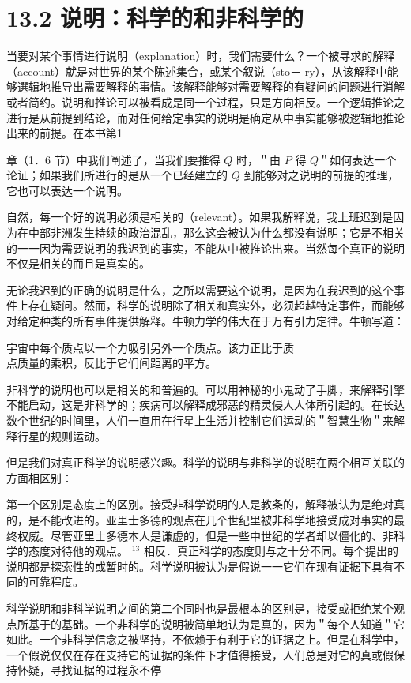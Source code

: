 \section*{13.2 说明：科学的和非科学的}
当要对某个事情进行说明（explanation）时，我们需要什么？一个被寻求的解释（account）就是对世界的某个陈述集合，或某个叙说（sto－ ry），从该解释中能够選辑地推导出需要解释的事情。该解释能够对需要解释的有疑问的问题进行消解或者简约。说明和推论可以被看成是同一个过程，只是方向相反。一个逻辑推论之进行是从前提到结论，而对任何给定事实的说明是确定从中事实能够被逻辑地推论出来的前提。在本书第1

章（1．6 节）中我们阐述了，当我们要推得 $Q$ 时，＂由 $P$ 得 $Q$＂如何表达一个论证；如果我们所进行的是从一个已经建立的 $Q$ 到能够对之说明的前提的推理，它也可以表达一个说明。

自然，每一个好的说明必须是相关的（relevant）。如果我解释说，我上班迟到是因为在中部非洲发生持续的政治混乱，那么这会被认为什么都没有说明；它是不相关的一一因为需要说明的我迟到的事实，不能从中被推论出来。当然每个真正的说明不仅是相关的而且是真实的。

无论我迟到的正确的说明是什么，之所以需要这个说明，是因为在我迟到的这个事件上存在疑问。然而，科学的说明除了相关和真实外，必须超越特定事件，而能够对给定种类的所有事件提供解释。牛顿力学的伟大在于万有引力定律。牛顿写道：

\begin{displayquote}
宇宙中每个质点以一个力吸引另外一个质点。该力正比于质\\
点质量的乘积，反比于它们间距离的平方。
\end{displayquote}

非科学的说明也可以是相关的和普遍的。可以用神秘的小鬼动了手脚，来解释引擎不能启动，这是非科学的；疾病可以解释成邪恶的精灵侵人人体所引起的。在长达数个世纪的时间里，人们一直用在行星上生活并控制它们运动的＂智慧生物＂来解释行星的规则运动。

但是我们对真正科学的说明感兴趣。科学的说明与非科学的说明在两个相互关联的方面相区别：

第一个区别是态度上的区别。接受非科学说明的人是教条的，解释被认为是绝对真的，是不能改进的。亚里士多德的观点在几个世纪里被非科学地接受成对事实的最终权威。尽管亚里士多德本人是谦虚的，但是一些中世纪的学者却以僵化的、非科学的态度对待他的观点。 ${ }^{13}$ 相反．真正科学的态度则与之十分不同。每个提出的说明都是探索性的或暂时的。科学说明被认为是假说一一它们在现有证据下具有不同的可靠程度。

科学说明和非科学说明之间的第二个同时也是最根本的区别是，接受或拒绝某个观点所基于的基础。一个非科学的说明被简单地认为是真的，因为＂每个人知道＂它如此。一个非科学信念之被坚持，不依赖于有利于它的证据之上。但是在科学中，一个假说仅仅在存在支持它的证据的条件下才值得接受，人们总是对它的真或假保持怀疑，寻找证据的过程永不停

